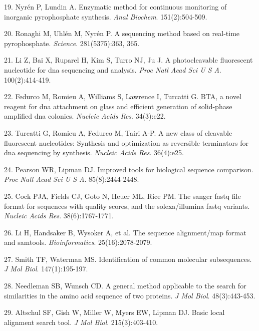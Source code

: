\documentclass[11pt,letterpaper]{book}
\begin{document}
\leavevmode\hypertarget{ref-nyren:1985aa}{}%
19. Nyrén P, Lundin A. Enzymatic method for continuous monitoring of inorganic pyrophosphate synthesis. \emph{Anal Biochem}. 151(2):504-509.

\leavevmode\hypertarget{ref-ronaghi:1998aa}{}%
20. Ronaghi M, Uhlén M, Nyrén P. A sequencing method based on real-time pyrophosphate. \emph{Science}. 281(5375):363, 365.

\leavevmode\hypertarget{ref-li:2003aa}{}%
21. Li Z, Bai X, Ruparel H, Kim S, Turro NJ, Ju J. A photocleavable fluorescent nucleotide for dna sequencing and analysis. \emph{Proc Natl Acad Sci U S A}. 100(2):414-419.

\leavevmode\hypertarget{ref-fedurco:2006aa}{}%
22. Fedurco M, Romieu A, Williams S, Lawrence I, Turcatti G. BTA, a novel reagent for dna attachment on glass and efficient generation of solid-phase amplified dna colonies. \emph{Nucleic Acids Res}. 34(3):e22.

\leavevmode\hypertarget{ref-turcatti:2008aa}{}%
23. Turcatti G, Romieu A, Fedurco M, Tairi A-P. A new class of cleavable fluorescent nucleotides: Synthesis and optimization as reversible terminators for dna sequencing by synthesis. \emph{Nucleic Acids Res}. 36(4):e25.

\leavevmode\hypertarget{ref-pearson:1988aa}{}%
24. Pearson WR, Lipman DJ. Improved tools for biological sequence comparison. \emph{Proc Natl Acad Sci U S A}. 85(8):2444-2448.

\leavevmode\hypertarget{ref-cock:2010aa}{}%
25. Cock PJA, Fields CJ, Goto N, Heuer ML, Rice PM. The sanger fastq file format for sequences with quality scores, and the solexa/illumina fastq variants. \emph{Nucleic Acids Res}. 38(6):1767-1771.

\leavevmode\hypertarget{ref-li:2009aa}{}%
26. Li H, Handsaker B, Wysoker A, et al. The sequence alignment/map format and samtools. \emph{Bioinformatics}. 25(16):2078-2079.

\leavevmode\hypertarget{ref-smith:1981aa}{}%
27. Smith TF, Waterman MS. Identification of common molecular subsequences. \emph{J Mol Biol}. 147(1):195-197.

\leavevmode\hypertarget{ref-needleman:1970aa}{}%
28. Needleman SB, Wunsch CD. A general method applicable to the search for similarities in the amino acid sequence of two proteins. \emph{J Mol Biol}. 48(3):443-453.

\leavevmode\hypertarget{ref-altschul:1990aa}{}%
29. Altschul SF, Gish W, Miller W, Myers EW, Lipman DJ. Basic local alignment search tool. \emph{J Mol Biol}. 215(3):403-410.
\end{document}
